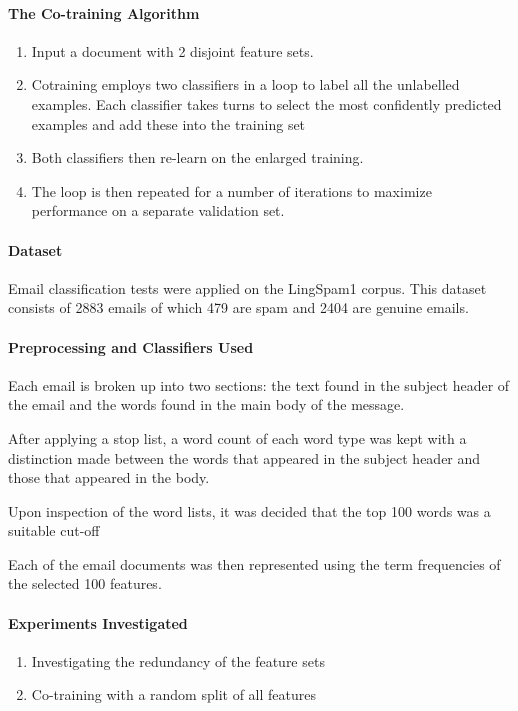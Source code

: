 \documentclass[12pt]{article}
\newenvironment{my_itemize}
{\begin{itemize}
  \setlength{\itemsep}{0cm}
  \setlength{\parskip}{0cm}}
{\end{itemize}}
\begin{document}
\paragraph{The Co-training Algorithm}
\begin{enumerate}
 \item Input a document with 2 disjoint feature sets.
 \item Cotraining employs two classifiers in a loop to label all the unlabelled examples. Each classifier takes turns to select the most confidently predicted examples and add these into the training set
 \item Both classifiers then re-learn on the enlarged training.
 \item The loop is then repeated for a number of iterations to maximize performance on a separate validation set.
\end{enumerate}

\paragraph{Dataset}
\begin{my_itemize}
 \item Email classification tests were applied on the LingSpam1 corpus. This dataset consists of 2883 emails of which 479 are spam and 2404 are genuine emails.
\end{my_itemize}

\paragraph{Preprocessing and Classifiers Used}
\begin{my_itemize}
 \item Each email is broken up into two sections: the text found in the subject header of the email and the words found in the main body of the message.
 \item After applying a stop list, a word count of each word type was kept with a distinction made between the words that appeared in the subject header and those that appeared in the body.
 \item Upon inspection of the word lists, it was decided that the top 100 words was a suitable cut-off
 \item Each of the email documents was then represented using the term frequencies of the selected 100 features.
\end{my_itemize}

\paragraph{Experiments Investigated}
\begin{enumerate}
 \item Investigating the redundancy of the feature sets
 \item Co-training with a random split of all features
\end{enumerate}
\end{document}
